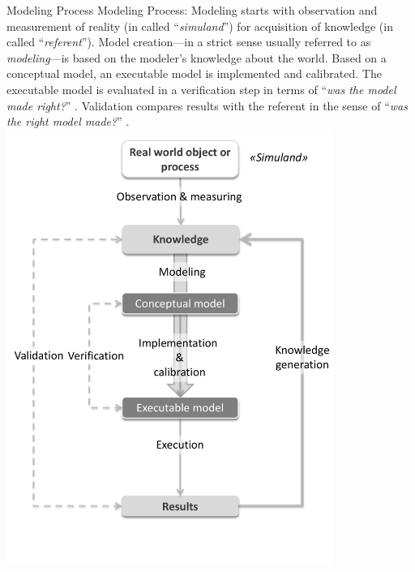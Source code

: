 \createfigure%
{Modeling Process}%
{Modeling Process: Modeling starts with observation and measurement of reality (in \citet[][]{Petty_SokolowskiBanks_2010} called ``\emph{simuland}'') for acquisition of knowledge (in \citet[][]{Petty_SokolowskiBanks_2010} called ``\emph{referent}''). Model creation---in a strict sense usually referred to as \emph{modeling}---is based on the modeler's knowledge about the world. Based on a conceptual model, an executable model is implemented and calibrated. The executable model is evaluated in a verification step in terms of ``\emph{was the model made right?}'' \citep[][p.332]{Petty_SokolowskiBanks_2010}. Validation compares results with the referent in the sense of ``\emph{was the right model made?}'' \citep[][p.332]{Petty_SokolowskiBanks_2010}.}%
{\label{fig:modeling}}%
{\includegraphics[width=0.8\textwidth, angle=0]{using/figures/modeling.pdf}}%
{}


